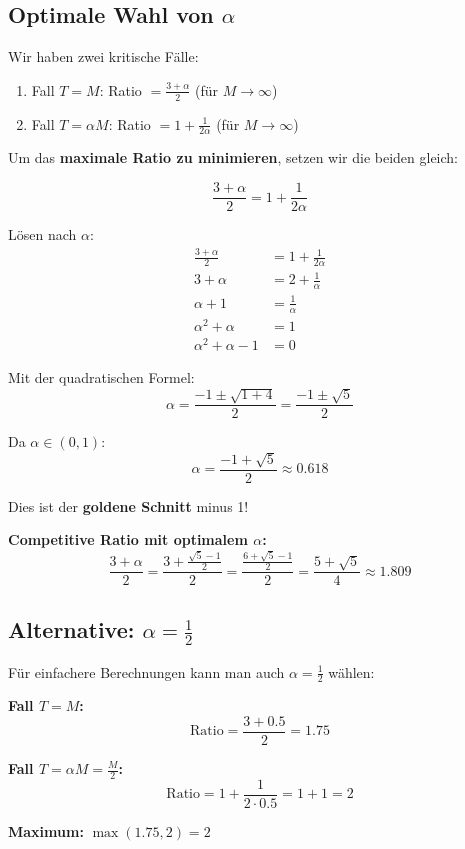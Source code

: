 \documentclass[12pt,a4paper]{article}
\theoremstyle{definition}
\begin{document}
\subsection{Optimale Wahl von $\alpha$}

Wir haben zwei kritische Fälle:
\begin{enumerate}
    \item Fall $T = M$: Ratio $= \frac{3+\alpha}{2}$ (für $M \to \infty$)
    \item Fall $T = \alpha M$: Ratio $= 1 + \frac{1}{2\alpha}$ (für $M \to \infty$)
\end{enumerate}

Um das \textbf{maximale Ratio zu minimieren}, setzen wir die beiden gleich:

\[
\frac{3+\alpha}{2} = 1 + \frac{1}{2\alpha}
\]

Lösen nach $\alpha$:
\begin{align*}
\frac{3+\alpha}{2} &= 1 + \frac{1}{2\alpha} \\
3 + \alpha &= 2 + \frac{1}{\alpha} \\
\alpha + 1 &= \frac{1}{\alpha} \\
\alpha^2 + \alpha &= 1 \\
\alpha^2 + \alpha - 1 &= 0
\end{align*}

Mit der quadratischen Formel:
\[
\alpha = \frac{-1 \pm \sqrt{1 + 4}}{2} = \frac{-1 \pm \sqrt{5}}{2}
\]

Da $\alpha \in (0,1)$:
\[
\alpha = \frac{-1 + \sqrt{5}}{2} \approx 0.618
\]

Dies ist der \textbf{goldene Schnitt} minus 1!

\textbf{Competitive Ratio mit optimalem $\alpha$:}
\[
\frac{3+\alpha}{2} = \frac{3 + \frac{\sqrt{5}-1}{2}}{2} = \frac{\frac{6 + \sqrt{5} - 1}{2}}{2} = \frac{5 + \sqrt{5}}{4} \approx 1.809
\]

\subsection{Alternative: $\alpha = \frac{1}{2}$}

Für einfachere Berechnungen kann man auch $\alpha = \frac{1}{2}$ wählen:

\textbf{Fall $T = M$:}
\[
\text{Ratio} = \frac{3 + 0.5}{2} = 1.75
\]

\textbf{Fall $T = \alpha M = \frac{M}{2}$:}
\[
\text{Ratio} = 1 + \frac{1}{2 \cdot 0.5} = 1 + 1 = 2
\]

\textbf{Maximum:} $\max(1.75, 2) = 2$
\end{document}
